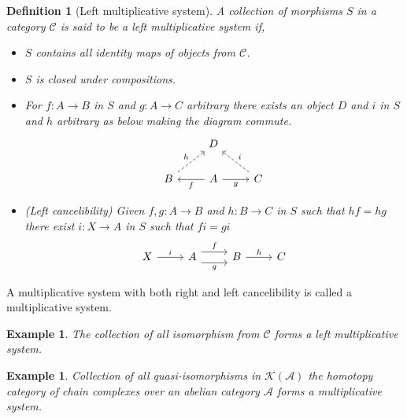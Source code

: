 \documentclass[12pt]{article}
\numberwithin{equation}{section}
\newcounter{dummy} \numberwithin{dummy}{section}
\newtheorem{definition}[dummy]{Definition}
\newtheorem{example}[dummy]{Example}
\begin{document}
		\begin{definition}[Left multiplicative system]
			A collection of morphisms $S$ in a category $\mathcal{C}$ is said to be a left multiplicative system if,
			\begin{itemize}
				\item $S$ contains all identity maps of objects from $\mathcal{C}$.
				\item $S$ is closed under compositions.
				\item For $f: A \to B $ in $S$ and $g: A \to C$ arbitrary there exists an object $D$ and $i$ in $S$ and $h$ arbitrary as below making the diagram commute.
				\[\begin{tikzcd}
					& D \\
					B & A & C
					\arrow["h", dashed, from=2-1, to=1-2]
					\arrow["f", from=2-2, to=2-1]
					\arrow["g"', from=2-2, to=2-3]
					\arrow["i"', dashed, from=2-3, to=1-2]
				\end{tikzcd}\]
				\item (Left cancelibility) Given $f,g: A\to B $ and $h: B \to C$ in $S$ such that $hf=hg$ there exist $i:X \to A$ in $S$ such that $fi=gi$
				\[\begin{tikzcd}
					X & A & B & C
					\arrow["i", from=1-1, to=1-2]
					\arrow["g"', shift right=2, from=1-2, to=1-3]
					\arrow["f", shift left=2, from=1-2, to=1-3]
					\arrow["h", from=1-3, to=1-4]
				\end{tikzcd}\]
			\end{itemize}
		\end{definition}
		A multiplicative system with both right and left cancelibility is called a multiplicative system.
		\begin{example}
			The collection of all isomorphism from $\mathcal{C}$ forms a left multiplicative system.
		\end{example}
		\begin{example}\label{ex-derived}
			Collection of all quasi-isomorphisms in $ \mathcal{K}(\mathcal{A})$ the homotopy category of chain complexes over an abelian category $\mathcal{A}$ forms a multiplicative system. 
		\end{example}
		
\end{document}
